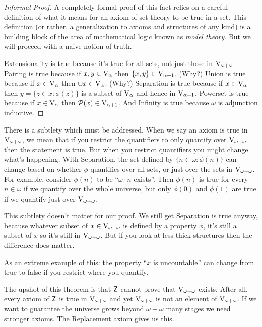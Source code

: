 \documentclass[10pt]{amsart}
\begin{document}
\begin{proof}[Informal Proof]
A completely formal proof of this fact relies on a careful definition of what it means for an axiom of set theory to be true in a set. This definition (or rather, a generalization to axioms and structures of any kind) is a building block of the area of mathematical logic known as \emph{model theory}. But we will proceed with a naive notion of truth.

Extensionality is true because it's true for all sets, not just those in $\mathrm{V}_{\omega+\omega}$. Pairing is true because if $x,y \in \mathrm{V}_\alpha$ then $\{x,y\} \in \mathrm{V}_{\alpha+1}$. (Why?) Union is true because if $x \in \mathrm{V}_\alpha$ then $\cup x \in \mathrm{V}_\alpha$. (Why?) Separation is true because if $x \in \mathrm{V}_\alpha$ then $y = \{ z \in x : \phi(z)\}$ is a subset of $\mathrm{V}_\alpha$ and hence in $\mathrm{V}_{\alpha+1}$. Powerset is true because if $x \in \mathrm{V}_\alpha$ then $\mathcal{P}(x) \in \mathrm{V}_{\alpha+1}$. And Infinity is true because $\omega$ is adjunction inductive.
\end{proof}

\begin{remark}
There is a subtlety which must be addressed. When we say an axiom is true in $\mathrm{V}_{\omega+\omega}$, we mean that if you restrict the quantifiers to only quantify over $\mathrm{V}_{\omega+\omega}$ then the statement is true. But when you restrict quantifiers you might change what's happening. With Separation, the set defined by $\{ n \in \omega : \phi(n) \}$ can change based on whether $\phi$ quantifies over all sets, or just over the sets in $\mathrm{V}_{\omega + \omega}$. For example, consider $\phi(n)$ to be ``$\omega \cdot n$ exists''. Then $\phi(n)$ is true for every $n \in \omega$ if we quantify over the whole universe, but only $\phi(0)$ and $\phi(1)$ are true if we quantify just over $\mathrm{V}_{\omega + \omega}$.

This subtlety doesn't matter for our proof. We still get Separation is true anyway, because whatever subset of $x \in \mathrm{V}_{\omega + \omega}$ is defined by a property $\phi$, it's still a subset of $x$ so it's still in $\mathrm{V}_{\omega + \omega}$. But if you look at less thick structures then the difference does matter.

As an extreme example of this: the property ``$x$ is uncountable'' can change from true to false if you restrict where you quantify.
\end{remark}

The upshot of this theorem is that $\mathsf{Z}$ cannot prove that $\mathrm{V}_{\omega+\omega}$ exists. After all, every axiom of $\mathsf{Z}$ is true in $\mathrm{V}_{\omega + \omega}$ and yet $\mathrm{V}_{\omega + \omega}$ is not an element of $\mathrm{V}_{\omega + \omega}$. If we want to guarantee the universe grows beyond $\omega + \omega$ many stages we need stronger axioms. The Replacement axiom gives us this.
\end{document}
